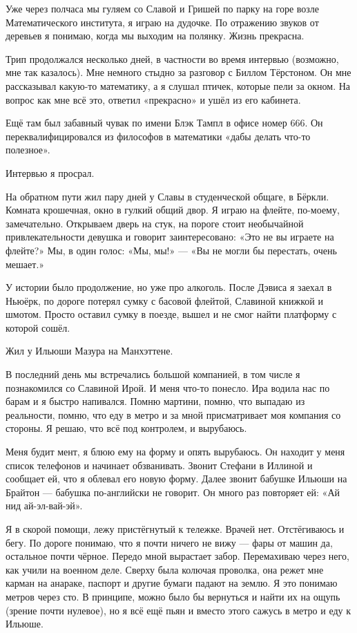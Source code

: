 \documentclass{book}
\begin{document}
Уже через полчаса мы гуляем со Славой и Гришей по парку на горе возле Математического института, я играю на дудочке.
По отражению звуков от деревьев я понимаю, когда мы выходим на полянку.
Жизнь прекрасна.

Трип продолжался несколько дней, в частности во время интервью (возможно, мне так казалось).
Мне немного стыдно за разговор с Биллом Тёрстоном.
Он мне рассказывал какую-то математику, а я слушал птичек, которые пели за окном.
На вопрос как мне всё это, ответил «прекрасно» и ушёл из его кабинета.

Ещё там был забавный чувак по имени Блэк Тампл в офисе номер 666.
Он переквалифицировался из философов в математики «дабы делать что-то полезное».

Интервью я просрал.

На обратном пути жил пару дней у Славы в студенческой общаге, в Бёркли.
Комната крошечная, окно в гулкий общий двор.
Я играю на флейте, по-моему, замечательно.
Открываем дверь на стук, на пороге стоит необычайной привлекательности девушка и говорит заинтересовано: «Это не вы играете на флейте?» 
Мы, в один голос: «Мы, мы!»
--- «Вы не могли бы перестать, очень мешает.»


\bigskip

У истории было продолжение, но уже про алкоголь.
После Дэвиса я заехал в Ньюёрк, по дороге потерял сумку с басовой флейтой, Славиной книжкой и шмотом.
Просто оставил сумку в поезде, вышел и не смог найти платформу с которой сошёл.

Жил у Ильюши Мазура на Манхэттене.

В последний день мы встречались большой компанией, в том числе я познакомился со Славиной Ирой.
И меня что-то понесло.
Ира водила нас по барам и я быстро напивался.
Помню мартини, помню, что выпадаю из реальности, помню, что еду в метро и за мной присматривает моя компания со стороны.
Я решаю, что всё под контролем, и вырубаюсь.

Меня будит мент, я блюю ему на форму и опять вырубаюсь.
Он находит у меня список телефонов и начинает обзванивать.
Звонит Стефани в Иллиной и сообщает ей, что я облевал его новую форму.
Далее звонит бабушке Ильюши на Брайтон --- бабушка по-английски не говорит.
Он много раз повторяет ей: «Ай нид ай-эл-вай-эй».

Я в скорой помощи, лежу пристёгнутый к тележке.
Врачей нет.
Отстёгиваюсь и бегу.
По дороге понимаю, что я почти ничего не вижу --- фары от машин да, остальное почти чёрное.
Передо мной вырастает забор.
Перемахиваю через него, как учили на военном деле.
Сверху была колючая проволка, она режет мне карман на анараке, паспорт и другие бумаги падают на землю.
Я это понимаю метров через сто.
В принципе, можно было бы вернуться и найти их на ощупь (зрение почти нулевое), но я всё ещё пьян и вместо этого сажусь в метро и еду к Ильюше.
\end{document}

